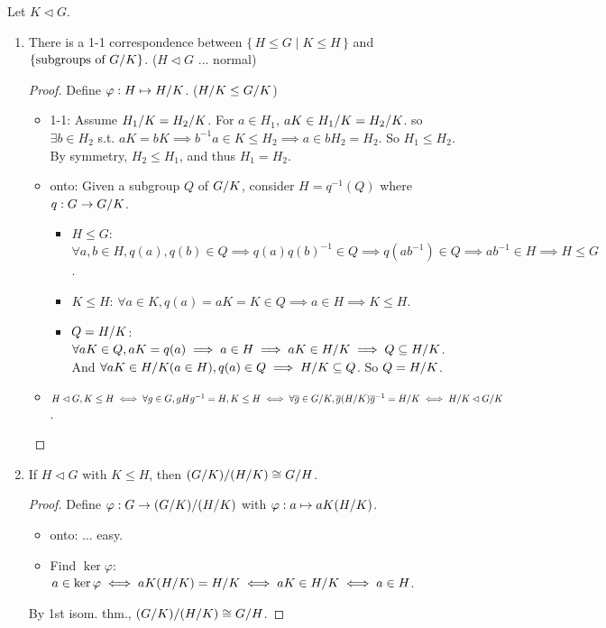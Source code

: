 \begin{theorem}
  Let $K \lhd G$.
  \begin{enumerate}
    \item There is a 1-1 correspondence between $\{\, H \le G \mid K \le H \,\}$
      and $\{ \text{subgroups of ${G}/{K}$} \}$. ($H \lhd G$ ... normal)
      \begin{proof}
        Define $\varphi: H \mapsto {H}/{K}$. (${H}/{K} \le {G}/{K}$)
        \begin{itemize}
          \item 1-1: Assume ${H_1}/{K} = {H_2}/{K}$.
            For $a \in H_1$, $aK \in {H_1}/{K} = {H_2}/{K}$.
            so $\exists b \in H_2$ s.t. $aK = bK \implies b^{-1}a \in K \le H_2
            \implies a \in b H_2 = H_2$. So $H_1 \le H_2$. By symmetry,
            $H_2 \le H_1$, and thus $H_1 = H_2$.
          \item onto: Given a subgroup $Q$ of ${G}/{K}$, consider
            $H = q^{-1}(Q)$ where $q: G\to {G}/{K}$.
            \begin{itemize}
              \item $H \le G$: $\forall a, b \in H, q(a), q(b) \in Q \implies
                q(a)q(b)^{-1} \in Q \implies q(ab^{-1}) \in Q \implies
                ab^{-1} \in H \implies H \le G$.
              \item $K \le H$: $\forall a \in K, q(a) = aK = K \in Q \implies
                a \in H \implies K \le H$.
              \item $Q = {H}/{K}$: $\forall aK \in Q, aK = q(a) \implies
                a \in H \implies aK \in {H}/{K} \implies
                Q \subseteq {H}/{K}$.
                And $\forall aK \in {H}/{K} (a \in H), q(a) \in Q \implies
                  {H}/{K} \subseteq Q$. So $Q = {H}/{K}$.
            \end{itemize}
          \item $H \lhd G, K \le H \iff \forall g\in G, gHg^{-1} = H, K \le H
            \iff \forall \overline{g} \in {G}/{K}, \overline{g}({H}/{K})\overline{g}^{-1}
            = {H}/{K} \iff {H}/{K} \lhd {G}/{K}$. \qedhere
        \end{itemize}
      \end{proof}
    \item If $H \lhd G$ with $K \le H$, then ${({G}/{K})}/{({H}/{K})}
      \cong {G}/{H}$.
      \begin{proof}
        Define $\varphi: G \to{({G}/{K})}/{({H}/{K})}$ with
        $\varphi: a \mapsto aK({H}/{K})$.
        \begin{itemize}
          \item onto: ... easy.
          \item Find $\ker \varphi$: $a \in \ker \varphi \iff aK({H}/{K})
            = {H}/{K} \iff aK \in {H}/{K} \iff a \in H$.
        \end{itemize}
        By 1st isom. thm., ${({G}/{K})}/{({H}/{K})} \cong
        {G}/{H}$.
      \end{proof}
  \end{enumerate}
\end{theorem}

